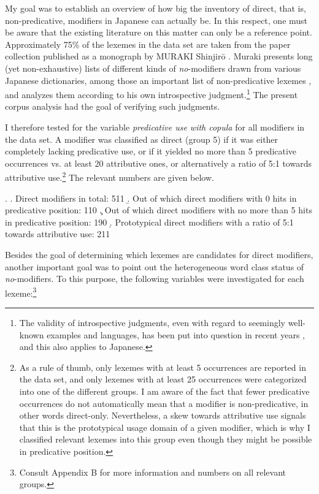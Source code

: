 My goal was to establish an overview of how big the inventory of direct, that is, non-predicative, modifiers in Japanese can actually be. In this respect, one must be aware that the existing literature on this matter can only be a reference point. Approximately 75\% of the lexemes in the data set are taken from the paper collection published as a monograph by MURAKI Shinjirō \citep{muraki:2012:nihongo}. Muraki presents long (yet non-exhaustive) lists of different kinds of \textit{no}-modifiers drawn from various Japanese dictionaries, among those an important list of non-predicative lexemes \citep[96–98]{muraki:2012:nihongo}, and analyzes them according to his own introspective judgment.\footnote{The validity of introspective judgments, even with regard to seemingly well-known examples and languages, has been put into question in recent years \citep{gibson:2010:weak}, and this also applies to Japanese.} The present corpus analysis had the goal of verifying such judgments.

I therefore tested for the variable \textit{predicative use with copula} for all modifiers in the data set. A modifier was classified as direct (group 5) if it was either completely lacking predicative use, or if it yielded no more than 5 predicative occurrences vs. at least 20 attributive ones, or alternatively a ratio of 5:1 towards attributive use.\footnote{As a rule of thumb, only lexemes with at least 5 occurrences are reported in the data set, and only lexemes with at least 25 occurrences were categorized into one of the different groups. I am aware of the fact that fewer predicative occurrences do not automatically mean that a modifier is non-predicative, in other words direct-only. Nevertheless, a skew towards attributive use signals that this is the prototypical usage domain of a given modifier, which is why I classified relevant lexemes into this group even though they might be possible in predicative position.} The relevant numbers are given below.

\ex. \a. Direct modifiers in total: 511
\b. Out of which direct modifiers with 0 hits in predicative position: 110
\c. Out of which direct modifiers with no more than 5 hits in predicative position: 190
\d. Prototypical direct modifiers with a ratio of 5:1 towards attributive use: 211

Besides the goal of determining which lexemes are candidates for direct modifiers, another important goal was to point out the heterogeneous word class status of \textit{no}-modifiers. To this purpose, the following variables were investigated for each lexeme:\footnote{Consult Appendix B for more information and numbers on all relevant groups.}

